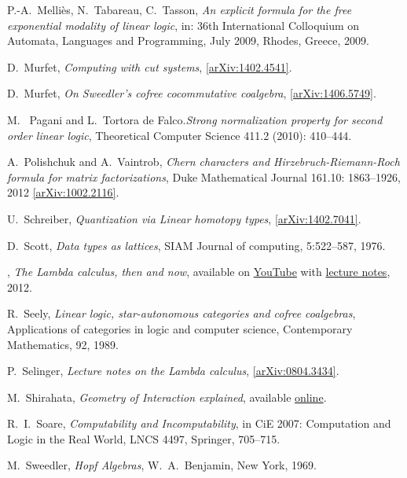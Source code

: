 \documentclass[english,letter paper,12pt,reqno]{article}
\theoremstyle{example}
\numberwithin{equation}{section}
\begin{document}
\begin{thebibliography}{BHLS03}
P.-A.~Melli\`{e}s, N.~Tabareau, C.~Tasson, \textsl{An explicit formula for the free exponential modality of linear logic}, in: 36th International Colloquium on Automata, Languages and Programming, July 2009, Rhodes, Greece, 2009.

D.~Murfet, \textsl{Computing with cut systems}, \href{http://arxiv.org/abs/1402.4541}{[arXiv:1402.4541]}.

D.~Murfet, \textsl{On Sweedler's cofree cocommutative coalgebra}, \href{http://arxiv.org/abs/1406.5749}{[arXiv:1406.5749]}.

M.~ Pagani and L.~Tortora de Falco.\textsl{Strong normalization property for second order linear logic}, Theoretical Computer Science 411.2 (2010): 410--444.

A.~Polishchuk and A.~Vaintrob, \textsl{Chern characters and {H}irzebruch-{R}iemann-{R}och formula for matrix factorizations}, Duke Mathematical Journal 161.10: 1863--1926, 2012 \href{http://arxiv.org/abs/1002.2116}{[arXiv:1002.2116]}. 

U.~Schreiber, \textsl{Quantization via {L}inear homotopy types}, \href{http://arxiv.org/abs/1402.7041}{[arXiv:1402.7041]}.

D.~Scott, \textsl{Data types as lattices}, SIAM Journal of computing, 5:522--587, 1976.

\bysame, \textsl{The {L}ambda calculus, then and now}, available on \href{http://www.youtube.com/watch?v=7cPtCpyBPNI}{YouTube} with \href{http://turing100.acm.org/lambda_calculus_timeline.pdf}{lecture notes}, 2012.

R.~Seely, \textsl{Linear logic, star-autonomous categories and cofree coalgebras}, Applications of categories in logic and computer science, Contemporary Mathematics, 92, 1989.

P.~Selinger, \textsl{Lecture notes on the {L}ambda calculus}, \href{http://arxiv.org/abs/0804.3434}{[arXiv:0804.3434]}.

M.~Shirahata, \textsl{Geometry of {I}nteraction explained}, available \href{http://www.kurims.kyoto-u.ac.jp/~hassei/algi-13/kokyuroku/19_shirahata.pdf}{online}.

R.~I.~Soare, \textsl{Computability and {I}ncomputability}, in CiE 2007: Computation and Logic in the Real World, LNCS 4497, Springer, 705--715.
  
M.~Sweedler, \textsl{Hopf Algebras}, W.~A.~Benjamin, New York, 1969.


\end{thebibliography}
\end{document}
